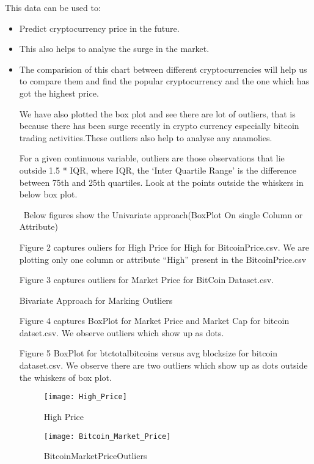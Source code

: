\documentclass{article}
\begin{document}
This data can be used to:
\begin{itemize}
\item Predict cryptocurrency price in the future.

\item This also helps to analyse the surge in the market.

\item The comparision of this chart between different cryptocurrencies will help us to compare them and find the popular cryptocurrency and the one which has got the highest price.

We have also plotted the box plot and see there are lot of outliers, that is because there has been surge recently in crypto currency especially bitcoin trading activities.These outliers also help to analyse any anamolies. 

For a given continuous variable, outliers are those observations that lie outside 1.5 * IQR, where IQR, the ‘Inter Quartile Range’ is the difference between 75th and 25th quartiles. Look at the points outside the whiskers in below box plot.

\ Below figures show the Univariate approach(BoxPlot On single Column or Attribute)

Figure 2 captures ouliers for High Price for High for BitcoinPrice.csv. We are plotting only one column or attribute “High” present in the BitcoinPrice.csv

Figure 3 captures outliers for Market Price for BitCoin Dataset.csv.\newline

Bivariate Approach for Marking Outliers\newine
 
Figure 4 captures BoxPlot for Market Price and Market Cap for bitcoin datset.csv. We observe outliers which show up as dots.

Figure 5 BoxPlot for btc\textunderscore total\textunderscore bitcoins versus avg \textunderscore block\textunderscore size for bitcoin dataset.csv. We observe there are two outliers which show up as dots outside the whiskers of box plot.


\begin{figure}
    \centering
    \texttt{[image: High\_Price]}
    \caption{High \textunderscore Price}
    \label{fig:my_label}
\end{figure}




\begin{figure}
    \centering
    \texttt{[image: Bitcoin\_Market\_Price]}
    \caption{Bitcoin\textunderscore Market\textunderscore Price\textunderscore Outliers}
    \label{fig:my_label}
\end{figure}



\end{itemize}
\end{document}
